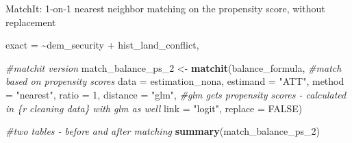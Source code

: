 \documentclass[
]{article}
\newenvironment{Shaded}{\begin{snugshade}}{\end{snugshade}}
\newcommand{\AttributeTok}[1]{\textcolor[rgb]{0.13,0.29,0.53}{#1}}
\newcommand{\CommentTok}[1]{\textcolor[rgb]{0.56,0.35,0.01}{\textit{#1}}}
\newcommand{\ConstantTok}[1]{\textcolor[rgb]{0.56,0.35,0.01}{#1}}
\newcommand{\DecValTok}[1]{\textcolor[rgb]{0.00,0.00,0.81}{#1}}
\newcommand{\FunctionTok}[1]{\textcolor[rgb]{0.13,0.29,0.53}{\textbf{#1}}}
\newcommand{\NormalTok}[1]{#1}
\newcommand{\OtherTok}[1]{\textcolor[rgb]{0.56,0.35,0.01}{#1}}
\newcommand{\StringTok}[1]{\textcolor[rgb]{0.31,0.60,0.02}{#1}}
\begin{document}
MatchIt: 1-on-1 nearest neighbor matching on the propensity score,
without replacement

exact = \textasciitilde dem\_security + hist\_land\_conflict,

\begin{Shaded}
\begin{Highlighting}[]
\CommentTok{\#matchit version}
\NormalTok{match\_balance\_ps\_2 }\OtherTok{\textless{}{-}} \FunctionTok{matchit}\NormalTok{(balance\_formula, }\CommentTok{\#match based on propensity scores}
                    \AttributeTok{data =}\NormalTok{ estimation\_nona, }
                    \AttributeTok{estimand =} \StringTok{"ATT"}\NormalTok{, }
                    \AttributeTok{method =} \StringTok{"nearest"}\NormalTok{, }
                    \AttributeTok{ratio =} \DecValTok{1}\NormalTok{,}
                    \AttributeTok{distance =} \StringTok{"glm"}\NormalTok{, }\CommentTok{\#glm gets propensity scores {-} calculated in \{r cleaning data\} with glm as well}
                    \AttributeTok{link =} \StringTok{"logit"}\NormalTok{, }
                    \AttributeTok{replace =} \ConstantTok{FALSE}\NormalTok{)}

\CommentTok{\#two tables {-} before and after matching}
\FunctionTok{summary}\NormalTok{(match\_balance\_ps\_2)}
\end{Highlighting}
\end{Shaded}
\end{document}
